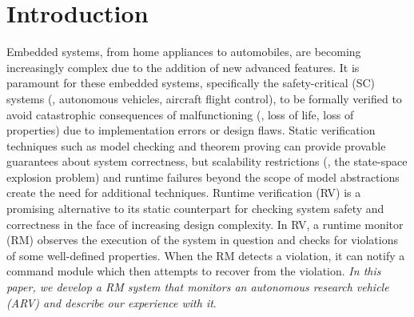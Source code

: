 \section{Introduction}
Embedded systems, from home appliances to automobiles, are becoming increasingly complex due to the addition of new advanced features. 
It is paramount for these embedded systems, specifically the safety-critical (SC) systems (\eg, autonomous vehicles, aircraft flight control), to be formally verified to avoid catastrophic consequences of malfunctioning (\eg, loss of life, loss of properties) due to implementation errors or design flaws. 
Static verification techniques such as model checking \cite{Clarke1996} and theorem proving \cite{Chang1997} can provide provable guarantees about system correctness, but scalability restrictions (\ie, the state-space explosion problem) and runtime failures beyond the scope of model abstractions \cite{Koopman2011} create the need for additional techniques.
Runtime verification (RV) is a promising alternative to its static counterpart for checking system safety and correctness in the face of increasing design complexity. 
In RV, a runtime monitor (RM) observes the execution of the system in question and checks for violations of some well-defined properties. 
When the RM detects a violation, it can notify a command module which then attempts to recover from the violation. \emph{In this paper, we develop a RM system that monitors an autonomous research vehicle (ARV) and describe our experience with it}.

